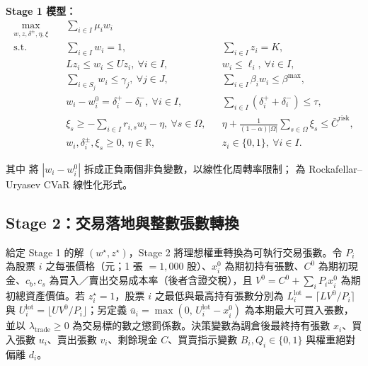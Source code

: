 \documentclass[11pt,a4paper]{article}
\begin{document}
\textbf{Stage 1 模型：}
\begin{align}
\max_{w, z, \delta^\pm, \eta, \xi}\quad & \sum_{i \in I} \mu_i w_i \label{obj1}\\
\text{s.t.}\quad
& \sum_{i \in I} w_i = 1, & & \sum_{i \in I} z_i = K, \label{c1:budget}\\
& L z_i \leq w_i \leq U z_i,\ \forall i \in I, & & w_i \leq \ell_i,\ \forall i \in I, \label{c1:box}\\
& \sum_{i \in S_j} w_i \leq \gamma_j,\ \forall j \in J, & & \sum_{i \in I} \beta_i w_i \leq \beta^{\max}, \label{c1:ind}\\
& w_i - w_i^0 = \delta_i^+ - \delta_i^-,\ \forall i \in I, & & \sum_{i \in I} (\delta_i^+ + \delta_i^-) \leq \tau, \label{c1:turn}\\
& \xi_s \geq -\sum_{i \in I} r_{i,s} w_i - \eta,\ \forall s \in \Omega, & & \eta + \frac{1}{(1-\alpha)|\Omega|}\sum_{s \in \Omega} \xi_s \leq \bar{C}^{\text{risk}}, \label{c1:cvar}\\
& w_i, \delta_i^\pm, \xi_s \geq 0,\ \eta \in \mathbb{R}, & & z_i \in \{0,1\},\ \forall i \in I. \nonumber
\end{align}

其中  將 $|w_i - w_i^0|$ 拆成正負兩個非負變數，以線性化周轉率限制； 為 Rockafellar–Uryasev CVaR 線性化形式。

\subsection{Stage 2：交易落地與整數張數轉換}

給定 Stage 1 的解 $(w^\star, z^\star)$，Stage 2 將理想權重轉換為可執行交易張數。令 $P_i$ 為股票 $i$ 之每張價格（元；1 張 $= 1{,}000$ 股）、$x_i^0$ 為期初持有張數、$C^0$ 為期初現金、$c_b, c_s$ 為買入／賣出交易成本率（後者含證交稅），且 $V^0 = C^0 + \sum_i P_i x_i^0$ 為期初總資產價值。若 $z_i^\star = 1$，股票 $i$ 之最低與最高持有張數分別為 $L_i^{\text{lot}} = \lceil L V^0 / P_i \rceil$ 與 $U_i^{\text{lot}} = \lfloor U V^0 / P_i \rfloor$；另定義 $\bar{u}_i = \max(0,\, U_i^{\text{lot}} - x_i^0)$ 為本期最大可買入張數，並以 $\lambda_{\text{trade}} \geq 0$ 為交易標的數之懲罰係數。決策變數為調倉後最終持有張數 $x_i$、買入張數 $u_i$、賣出張數 $v_i$、剩餘現金 $C$、買賣指示變數 $B_i, Q_i \in \{0,1\}$ 與權重絕對偏離 $d_i$。
\end{document}
